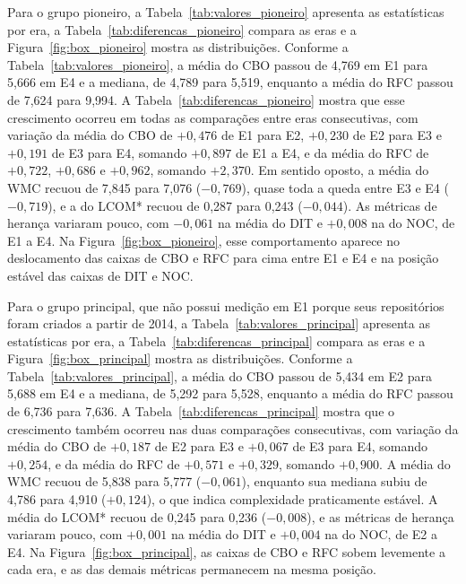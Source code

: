 Para o grupo pioneiro, a Tabela~\ref{tab:valores_pioneiro} apresenta as estatísticas por era, a Tabela~\ref{tab:diferencas_pioneiro} compara as eras e a Figura~\ref{fig:box_pioneiro} mostra as distribuições. Conforme a Tabela~\ref{tab:valores_pioneiro}, a média do CBO passou de 4,769 em E1 para 5,666 em E4 e a mediana, de 4,789 para 5,519, enquanto a média do RFC passou de 7,624 para 9,994. A Tabela~\ref{tab:diferencas_pioneiro} mostra que esse crescimento ocorreu em todas as comparações entre eras consecutivas, com variação da média do CBO de $+0{,}476$ de E1 para E2, $+0{,}230$ de E2 para E3 e $+0{,}191$ de E3 para E4, somando $+0{,}897$ de E1 a E4, e da média do RFC de $+0{,}722$, $+0{,}686$ e $+0{,}962$, somando $+2{,}370$. Em sentido oposto, a média do WMC recuou de 7,845 para 7,076 ($-0{,}769$), quase toda a queda entre E3 e E4 ($-0{,}719$), e a do LCOM* recuou de 0,287 para 0,243 ($-0{,}044$). As métricas de herança variaram pouco, com $-0{,}061$ na média do DIT e $+0{,}008$ na do NOC, de E1 a E4. Na Figura~\ref{fig:box_pioneiro}, esse comportamento aparece no deslocamento das caixas de CBO e RFC para cima entre E1 e E4 e na posição estável das caixas de DIT e NOC.





Para o grupo principal, que não possui medição em E1 porque seus repositórios foram criados a partir de 2014, a Tabela~\ref{tab:valores_principal} apresenta as estatísticas por era, a Tabela~\ref{tab:diferencas_principal} compara as eras e a Figura~\ref{fig:box_principal} mostra as distribuições. Conforme a Tabela~\ref{tab:valores_principal}, a média do CBO passou de 5,434 em E2 para 5,688 em E4 e a mediana, de 5,292 para 5,528, enquanto a média do RFC passou de 6,736 para 7,636. A Tabela~\ref{tab:diferencas_principal} mostra que o crescimento também ocorreu nas duas comparações consecutivas, com variação da média do CBO de $+0{,}187$ de E2 para E3 e $+0{,}067$ de E3 para E4, somando $+0{,}254$, e da média do RFC de $+0{,}571$ e $+0{,}329$, somando $+0{,}900$. A média do WMC recuou de 5,838 para 5,777 ($-0{,}061$), enquanto sua mediana subiu de 4,786 para 4,910 ($+0{,}124$), o que indica complexidade praticamente estável. A média do LCOM* recuou de 0,245 para 0,236 ($-0{,}008$), e as métricas de herança variaram pouco, com $+0{,}001$ na média do DIT e $+0{,}004$ na do NOC, de E2 a E4. Na Figura~\ref{fig:box_principal}, as caixas de CBO e RFC sobem levemente a cada era, e as das demais métricas permanecem na mesma posição.

